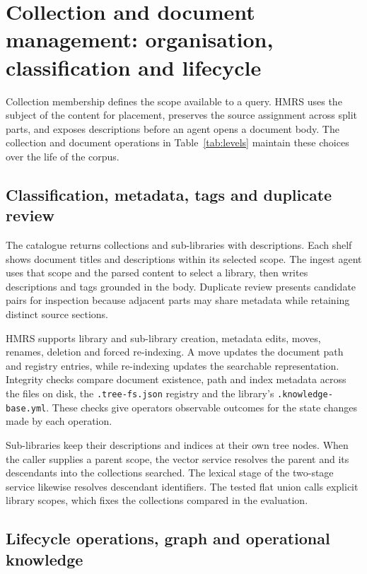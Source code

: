 \section{Collection and document management: organisation, classification and
lifecycle}
\label{sec:organization}

Collection membership defines the scope available to a query. HMRS uses
the subject of the content for placement, preserves the source assignment
across split parts, and exposes descriptions before an agent opens a
document body. The collection and document operations in
Table~\ref{tab:levels} maintain these choices over the life of the corpus.

\subsection{Classification, metadata, tags and duplicate review}
\label{sec:org-placement}
\label{sec:org-registries}
\label{sec:org-tags}
\label{sec:org-dedup}

The catalogue returns collections and sub-libraries with descriptions.
Each shelf shows document titles and descriptions within its selected scope.
The ingest agent uses that scope and the parsed content to select a library,
then writes descriptions and tags grounded in the body. Duplicate review
presents candidate pairs for inspection because adjacent parts may share
metadata while retaining distinct source sections.

HMRS supports library and sub-library creation, metadata edits, moves,
renames, deletion and forced re-indexing. A move updates the document path
and registry entries, while re-indexing updates the searchable representation.
Integrity checks compare document existence, path and index metadata across
the files on disk, the \texttt{.tree-fs.json} registry and the library's
\texttt{.knowledge-base.yml}. These checks give operators observable
outcomes for the state changes made by each operation.

Sub-libraries keep their descriptions and indices at their own tree nodes.
When the caller supplies a parent scope, the vector service resolves the
parent and its descendants into the collections searched. The lexical stage
of the two-stage service likewise resolves descendant identifiers. The
tested flat union calls explicit library scopes, which fixes the collections
compared in the evaluation.

\subsection{Lifecycle operations, graph and operational knowledge}
\label{sec:org-lifecycle}
\label{sec:org-graph}
\label{sec:org-experience}


